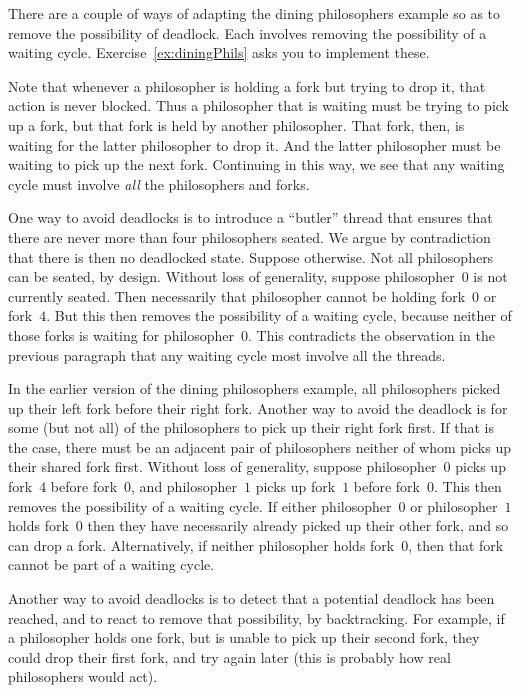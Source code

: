 There are a couple of ways of adapting the dining philosophers example so as
to remove the possibility of deadlock.  Each involves removing the possibility
of a waiting cycle.  Exercise~\ref{ex:diningPhils} asks you to implement
these. 

Note that whenever a philosopher is holding a fork but trying to drop it, that
action is never blocked.  Thus a philosopher that is waiting must be trying to
pick up a fork, but that fork is held by another philosopher.  That fork,
then, is waiting for the latter philosopher to drop it.  And the latter
philosopher must be waiting to pick up the next fork.  Continuing in this way,
we see that any waiting cycle must involve \emph{all} the philosophers and
forks. 

One way to avoid deadlocks is to introduce a ``butler'' thread that ensures
that there are never more than four philosophers seated.  We argue by
contradiction that there is then no deadlocked state.  Suppose otherwise.  Not
all philosophers can be seated, by design.  Without loss of generality,
suppose philosopher~$0$ is not currently seated.  Then necessarily that
philosopher cannot be holding fork~$0$ or fork~$4$.  But this then removes the
possibility of a waiting cycle, because neither of those forks is waiting for
philosopher~$0$.  This contradicts the observation in the previous paragraph
that any waiting cycle most involve all the threads.

In the earlier version of the dining philosophers example, all philosophers
picked up their left fork before their right fork.  Another way to avoid the
deadlock is for some (but not all) of the philosophers to pick up their right
fork first.  If that is the case, there must be an adjacent pair of
philosophers neither of whom picks up their shared fork first.  Without loss
of generality, suppose philosopher~$0$ picks up fork~$4$ before fork~$0$, and
philosopher~$1$ picks up fork~$1$ before fork~$0$.  This then removes the
possibility of a waiting cycle.  If either philosopher~$0$ or philosopher~$1$
holds fork~$0$ then they have necessarily already picked up their other fork,
and so can drop a fork.  Alternatively, if neither philosopher holds fork~$0$,
then that fork cannot be part of a waiting cycle.

Another way to avoid deadlocks is to detect that a potential deadlock has been
reached, and to react to remove that possibility, by backtracking.  For
example, if a philosopher holds one fork, but is unable to pick up their
second fork, they could drop their first fork, and try again later (this is
probably how real philosophers would act).

